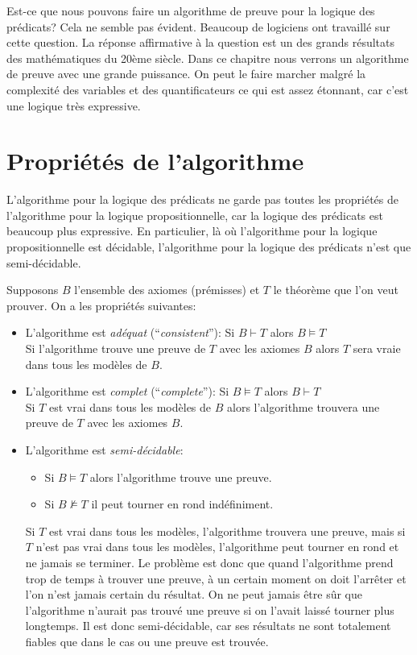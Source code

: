 {Est-ce que nous pouvons faire un algorithme de preuve pour la logique des prédicats?
Cela ne semble pas évident.
Beaucoup de logiciens ont travaillé sur cette question.
La réponse affirmative à la question est un des grands résultats des mathématiques du 20ème siècle.
Dans ce chapitre nous verrons un algorithme de preuve avec une grande puissance.
On peut le faire marcher malgré la complexité des variables et des quantificateurs ce qui est assez étonnant,
car c'est une logique très expressive. 

\section{Propriétés de l'algorithme}

L'algorithme pour la logique des prédicats
ne garde pas toutes les propriétés de l'algorithme pour la logique propositionnelle,
car la logique des prédicats est beaucoup plus expressive.
En particulier, là où l'algorithme pour la logique propositionnelle est décidable,
l'algorithme pour la logique des prédicats n'est que semi-décidable.

Supposons $B$ l'ensemble des axiomes (prémisses) et $T$ le théorème que l'on veut prouver.
On a les propriétés suivantes:
\begin{itemize}
\item L'algorithme est {\em adéquat} (``{\em consistent}''): Si $B\vdash T$ alors $B \models T$\\
Si l'algorithme trouve une preuve de $T$ avec les axiomes $B$ alors $T$ sera vraie dans tous les modèles de $B$.
\item L'algorithme est {\em complet} (``{\em complete}''): Si $B \models T$ alors $B\vdash T$\\
Si $T$ est vrai dans tous les modèles de $B$ alors l'algorithme trouvera une preuve de $T$ avec les axiomes $B$.
\item L'algorithme est {\em semi-décidable}:
\begin{itemize}
\item Si $B \models T$ alors l'algorithme trouve une preuve. 
\item Si $B \not\models T$ il peut tourner en rond indéfiniment.
\end{itemize}
Si $T$ est vrai dans tous les modèles, l'algorithme trouvera une preuve, mais si $T$ n'est pas
vrai dans tous les modèles, l'algorithme peut tourner en rond et ne jamais se terminer.
Le problème est donc que quand l'algorithme prend trop de temps à trouver une preuve,
à un certain moment on doit l'arrêter et l'on n'est jamais certain du résultat.
On ne peut jamais être sûr que l'algorithme n'aurait pas trouvé une preuve si on l'avait laissé tourner plus longtemps.
Il est donc semi-décidable, car ses résultats ne sont totalement fiables que dans le cas ou une preuve est trouvée.
\end{itemize}

}
